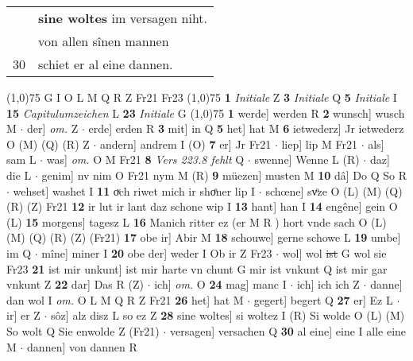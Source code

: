 \documentclass[8pt,a4paper,notitlepage]{article}
\begin{document}
\begin{table}[ht]
\begin{minipage}[t]{0.5\linewidth}
\begin{tabular}{rl}
 & \textbf{sine woltes} im versagen niht.\\ 
 & von allen sînen mannen\\ 
30 & schiet er al eine dannen.\\ 
\end{tabular}
\scriptsize
\line(1,0){75} \newline
G I O L M Q R Z Fr21 Fr23 \newline
\line(1,0){75} \newline
\textbf{1} \textit{Initiale} Z  \textbf{3} \textit{Initiale} Q  \textbf{5} \textit{Initiale} I  \textbf{15} \textit{Capitulumzeichen} L  \textbf{23} \textit{Initiale} G  \newline
\line(1,0){75} \newline
\textbf{1} werde] werden R \textbf{2} wunsch] wusch M  $\cdot$ der] \textit{om.} Z  $\cdot$ erde] erden R \textbf{3} mit] in Q \textbf{5} het] hat M \textbf{6} ietwederz] Jr ietwederz O (M) (Q) (R) Z  $\cdot$ andern] andrem I (O) \textbf{7} er] Jr Fr21  $\cdot$ liep] lip M Fr21  $\cdot$ als] sam L  $\cdot$ was] \textit{om.} O M Fr21 \textbf{8} \textit{Vers 223.8 fehlt} Q   $\cdot$ swenne] Wenne L (R)  $\cdot$ daz] die L  $\cdot$ genim] nv nim O Fr21 nym M (R) \textbf{9} müezen] musten M \textbf{10} dâ] Do Q So R  $\cdot$ wehset] washet I \textbf{11} oͮch riwet mich ir shoͤner lip I  $\cdot$ schœne] svͦze O (L) (M) (Q) (R) (Z) Fr21 \textbf{12} ir lut ir lant daz schone wip I \textbf{13} hant] han I \textbf{14} engêne] gein O (L) \textbf{15} morgens] tagesz L \textbf{16} Manich ritter ez (er M R ) hort vnde sach O (L) (M) (Q) (R) (Z) (Fr21) \textbf{17} obe ir] Abir M \textbf{18} schouwe] gerne schowe L \textbf{19} umbe] im Q  $\cdot$ mîne] miner I \textbf{20} obe der] weder I Ob ir Z Fr23  $\cdot$ wol] wol \sout{ist} G wol sie Fr23 \textbf{21} ist mir unkunt] ist mir harte vn chunt G mir ist vnkunt Q ist mir gar vnkunt Z \textbf{22} dar] Das R (Z)  $\cdot$ ich] \textit{om.} O \textbf{24} mag] manc I  $\cdot$ ich] ich ich Z  $\cdot$ danne] dan wol I \textit{om.} O L M Q R Z Fr21 \textbf{26} het] hat M  $\cdot$ gegert] begert Q \textbf{27} er] Ez L  $\cdot$ ir] er Z  $\cdot$ sôz] alz disz L so ez Z \textbf{28} sine woltes] si woltez I (R) Si wolde O (L) (M) So wolt Q Sie enwolde Z (Fr21)  $\cdot$ versagen] versachen Q \textbf{30} al eine] eine I alle eine M  $\cdot$ dannen] von dannen R \newline
\end{minipage}
\hspace{0.5cm}
\begin{minipage}[t]{0.5\linewidth}

\end{minipage}
\end{table}
\end{document}
